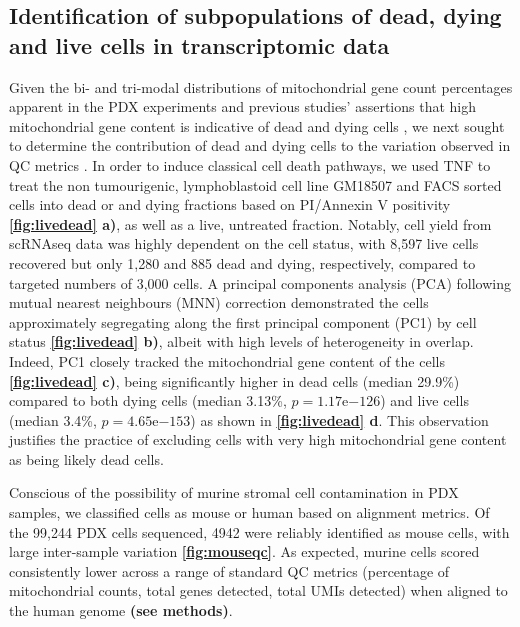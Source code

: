  \subsection{Identification of subpopulations of dead, dying and live cells in transcriptomic data}
Given the bi- and tri-modal distributions of mitochondrial gene count percentages \cite{o2019dissociation} apparent in the PDX experiments and previous studies' assertions that high mitochondrial gene content is indicative of dead and dying cells \cite{ilicic2016classification, zhao2002mitochondrial}, we next sought to determine the contribution of dead and dying cells to the variation observed in QC metrics  \cite{o2019dissociation}. In order to induce classical cell death pathways, we used TNF\textalpha    
 \cite{carswell1975endotoxin, sedger2014tnf} to treat the non tumourigenic, lymphoblastoid cell line GM18507 and FACS sorted cells into dead or and dying fractions based on PI/Annexin V positivity \textbf{\autoref{fig:livedead} a)}, as well as a live, untreated fraction. Notably, cell yield from scRNAseq data was highly dependent on the cell status, with 8,597 live cells recovered but only 1,280 and 885 dead and dying, respectively, compared to targeted numbers of 3,000 cells. 
A principal components analysis (PCA) following mutual nearest neighbours (MNN) correction \cite{haghverdi2018batch} demonstrated the cells approximately segregating along the first principal component (PC1) by cell status \textbf{\autoref{fig:livedead} b)}, albeit with high levels of heterogeneity in overlap. Indeed, PC1 closely tracked the mitochondrial gene content of the cells \textbf{\autoref{fig:livedead} c)}, being significantly higher in dead cells (median 29.9\%) compared to both dying cells (median 3.13\%, $p=1.17 \mathrm{e}{-126}$) and live cells (median 3.4\%, $p=4.65 \mathrm{e}{-153}$) as shown in \textbf{\autoref{fig:livedead} d}.
This observation justifies the practice of excluding cells with very high mitochondrial gene content as being likely dead cells.

Conscious of the possibility of murine stromal cell contamination in PDX samples, we classified cells as mouse or human based on alignment metrics. Of the 99,244 PDX cells sequenced, 4942 were reliably identified as mouse cells, with large inter-sample variation \textbf{\autoref{fig:mouseqc}}.
As expected, murine cells scored consistently lower across a range of standard QC metrics (percentage of mitochondrial counts, total genes detected, total \ac{UMIs} detected) when aligned to the human genome \textbf{(see methods)}.

